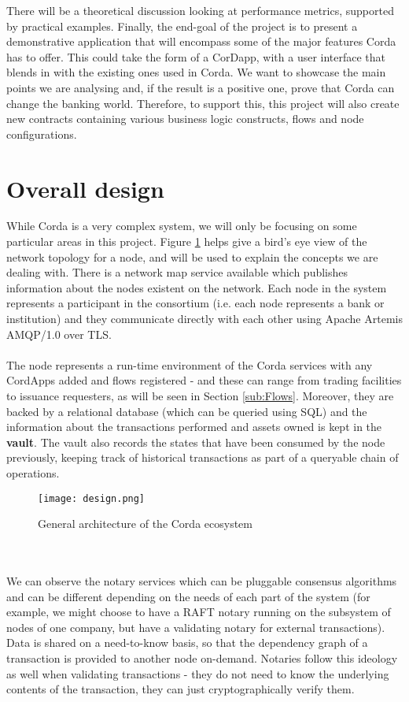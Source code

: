 \documentclass[12pt,twoside]{article}
\begin{document}
There will be a theoretical discussion looking at performance metrics, supported by practical examples. Finally, the end-goal of the project is to present a demonstrative application that will encompass some of the major features Corda has to offer. This could take the form of a CorDapp, with a user interface that blends in with the existing ones used in Corda. We want to showcase the main points we are analysing and, if the result is a positive one, prove that Corda can change the banking world. Therefore, to support this, this project will also create new contracts containing various business logic constructs, flows and node configurations.
\newpage
\section{Overall design}
\label{sec:Design}
While Corda is a very complex system, we will only be focusing on some particular areas in this project. Figure \ref{fig:design} helps give a bird's eye view of the network topology for a node, and will be used to explain the concepts we are dealing with. There is a network map service available which publishes information about the nodes existent on the network. Each node in the system represents a participant in the consortium (i.e. each node represents a bank or institution) and they communicate directly with each other using Apache Artemis AMQP/1.0 over TLS. 
\\ \\
The node represents a run-time environment of the Corda services with any CordApps added and flows registered - and these can range from trading facilities to issuance requesters, as will be seen in Section \ref{sub:Flows}. Moreover, they are backed by a relational database (which can be queried using SQL) and the information about the transactions performed and assets owned is kept in the \textbf{vault}. The vault also records the states that have been consumed by the node previously, keeping track of historical transactions as part of a queryable chain of operations.
\begin{figure}[!htb]
\centering
\texttt{[image: design.png]}
\caption{General architecture of the Corda ecosystem \cite{fig:design}}
\centering
\label{fig:design}
\end{figure}
\\ \\
We can observe the notary services which can be pluggable consensus algorithms and can be different depending on the needs of each part of the system (for example, we might choose to have a RAFT notary running on the subsystem of nodes of one company, but have a validating notary for external transactions). Data is shared on a need-to-know basis, so that the dependency graph of a transaction is provided to another node on-demand. Notaries follow this ideology as well when validating transactions - they do not need to know the underlying contents of the transaction, they can just cryptographically verify them.
\end{document}
